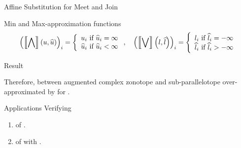 


\begin{frame}{Affine Substitution for Meet and Join}

{\small
\begin{exampleblock}{Min and Max-approximation functions}
\vspace{-1em}
\begin{align*}
&\left(\left\llbracket\bigwedge\right\rrbracket\left(u,\widehat{u}\right)\right)_i=
\left\{
\begin{array}{l}
u_i~\text{if}~\widehat{u}_i=\infty\\
\widehat{u}_i~\text{if}~\widehat{u}_i<\infty
\end{array}
\right.,\hspace{1em}
\left(\left\llbracket\bigvee\right\rrbracket\left(l,\widehat{l}\right)\right)_i=
\left\{
\begin{array}{l}
l_i~\text{if}~\widehat{l}_i=-\infty\\
\widehat{l}_i~\text{if}~\widehat{l}_i>-\infty
\end{array}
\right.\\
\end{align*}
%
\end{exampleblock}
}
%
\begin{block}{Result}
%
\end{block}
%
\begin{alertblock}{}
{\small Therefore,  between augmented complex zonotope and sub-parallelotope over-approximated by  for .}
\end{alertblock}
\end{frame}



%
\begin{frame}{Applications}
Verifying
\begin{enumerate}
\item {} of .
\item {} of  with .
\end{enumerate}
\end{frame}

